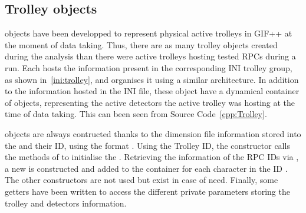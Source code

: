 	\subsection{Trolley objects}
	\label{app2:ssec:Trolley}
	
	 objects have been developped to represent physical active trolleys in GIF++ at the moment of data taking. Thus, there are as many trolley objects created during the analysis than there were active trolleys hosting tested RPCs during a run. Each  hosts the information present in the corresponding INI trolley group, as shown in~\ref{ini:trolley}, and organises it using a similar architecture. In addition to the information hosted in the INI file, these object have a dynamical container of  objects, representing the active detectors the active trolley was hosting at the time of data taking. This can been seen from Source Code~\ref{cpp:Trolley}.
	
	 objects are always contructed thanks to the dimension file information stored into the  and their ID, using the format . Using the Trolley ID, the constructor calls the methods of  to initialise the . Retrieving the information of the RPC IDs via , a new  is constructed and added to the container  for each character in the ID . The other constructors are not used but exist in case of need. Finally, some getters have been written to access the different private parameters storing the trolley and detectors information.\\
	
